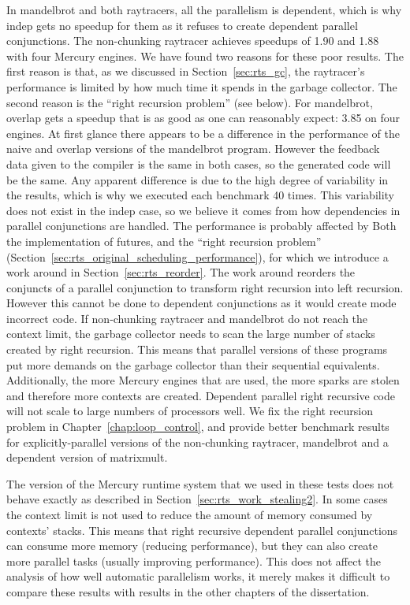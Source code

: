 In mandelbrot and both raytracers,
all the parallelism is dependent,
which is why indep gets no speedup for them as it refuses to create
dependent parallel conjunctions.
The non-chunking raytracer achieves speedups of 1.90 and 1.88 with four Mercury engines.
We have found two reasons for these poor results.
The first reason is that, as we discussed in
Section~\ref{sec:rts_gc},
the raytracer's performance is limited by how much time it spends in the
garbage collector.
The second reason is the ``right recursion problem'' (see below).
For mandelbrot, overlap gets a speedup
that is as good as one can reasonably expect: 3.85 on four engines.
At first glance there appears to be a difference in the performance of the
naive and overlap versions of the mandelbrot program.
However the feedback data given to the compiler is the same in both cases,
so the generated code will be the same.
Any apparent difference is due to the high degree of variability in the
results,
which is why we executed each benchmark 40 times.
This variability does not exist in the indep case,
so we believe it comes from how dependencies in parallel conjunctions are
handled.
The performance is probably affected by
Both the implementation of futures,
and the ``right recursion problem''
(Section~\ref{sec:rts_original_scheduling_performance}),
for which we introduce a work around 
in Section~\ref{sec:rts_reorder}.
The work around reorders the conjuncts of a parallel conjunction to
transform right recursion into left recursion.
However this cannot be done to dependent conjunctions as it would create
mode incorrect code.
If non-chunking raytracer and mandelbrot do not reach the context limit,
the garbage collector needs to scan the large number of stacks created by
right recursion.
This means that parallel versions of these programs put more demands on the
garbage collector than their sequential equivalents.
Additionally,
the more Mercury engines that are used, the more sparks are stolen and
therefore more contexts are created.
Dependent parallel right recursive code will not scale to large numbers of
processors well.
We fix the right recursion problem
in Chapter~\ref{chap:loop_control},
and provide better benchmark results for explicitly-parallel versions of the
non-chunking raytracer, mandelbrot and a dependent version of matrixmult.

The version of the Mercury runtime system that we used in these tests
does not behave exactly as described in
Section~\ref{sec:rts_work_stealing2}.
In some cases the context limit is not used to reduce the amount of memory
consumed by contexts' stacks.
This means that right recursive dependent parallel conjunctions can consume
more memory (reducing performance),
but they can also create more parallel tasks (usually improving
performance).
This does not affect the analysis of how well automatic parallelism works,
it merely makes it difficult to compare these results with results in the
other chapters of the dissertation.

